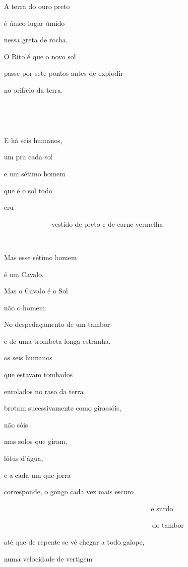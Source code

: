 A terra do ouro preto

é único lugar úmido

nessa greta de rocha.

O Rito é que o novo sol

passe por sete pontos antes de explodir

no orifício da terra.

~


~

E há seis humanos,


um pra cada sol

e um sétimo homem

que é o sol todo

cru

~~~~~~~~~~~~~ vestido de preto e de carne vermelha

~

Mas esse sétimo homem

é um Cavalo,


Mas o Cavalo é o Sol

não o homem.

No despedaçamento de um tambor

e de uma trombeta longa estranha, 


os seis humanos

que estavam tombados

enrolados no raso da terra

brotam sucessivamente como girassóis,

não sóis

mas solos que giram,

lótus d'água, 

e a cada um que jorra

corresponde, o gongo cada vez mais escuro

~~~~~~~~~~~~~~~~~~~~~~~~~~~~ ~~~~~~~~~~~~~ e surdo

~~~~~~~~~~~~~~~~~~~~~~~~~~~~~~~~~~~~~~~~~~ do tambor

até que de repente se vê chegar a todo galope,

numa velocidade de vertigem

